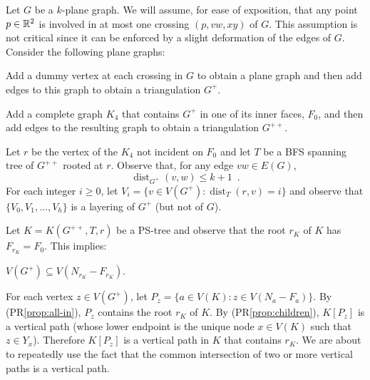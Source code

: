 \documentclass{patmorin}
\DeclareMathOperator{\dist}{dist}
\renewcommand{\proplabel}[1]{\label{prop:#1}}
\renewcommand{\propref}[1]{(PR\ref{prop:#1})}
\begin{document}
Let $G$ be a $k$-plane graph.  We will assume, for ease of exposition, that any point $p\in\mathbb{R}^2$ is involved in at most one crossing $(p,vw,xy)$ of $G$. This assumption is not critical since it can be enforced by a slight deformation of the edges of $G$.   Consider the following plane graphs:
\begin{compactenum}
  \item Add a dummy vertex at each crossing in $G$ to obtain a plane graph and then add edges to this graph to obtain a triangulation $G^+$.
  \item Add a complete graph $K_4$ that contains $G^{+}$ in one of its inner faces, $F_0$, and then add edges to the resulting graph to obtain a triangulation $G^{++}$.
\end{compactenum}
Let $r$ be the vertex of the $K_4$ not incident on $F_0$ and let $T$ be a BFS spanning tree of $G^{++}$ rooted at $r$. Observe that, for any edge $vw\in E(G)$, 
\[  \dist_{G^+}(v,w) \le k+1 \enspace . \]
For each integer $i\ge 0$, let $V_i=\{v\in V(G^+): \dist_{T}(r,v)=i\}$ and observe that $\{V_0,V_1,\ldots,V_{h}\}$ is a layering of $G^+$ (but not of $G$).

Let $K=K(G^{++},T,r)$ be a PS-tree and observe that the root $r_K$ of $K$ has $F_{r_K}=F_0$.  This implies:
\begin{compactenum}[(PR1)]\setcounter{enumi}{4}
  \item \proplabel{all-in}  $V(G^+)\subseteq V(N_{r_K}-F_{r_K})$.
\end{compactenum}

For each vertex $z\in V(G^+)$, let $P_z=\{a\in V(K): z\in V(N_a-F_a)\}$.  
By \propref{all-in}, $P_{z}$ contains the root $r_K$ of $K$.  By \propref{children}, $K[P_z]$ is a vertical path (whose lower endpoint is the unique node $x\in V(K)$ such that $z\in Y_x$). Therefore $K[P_z]$ is a vertical path in $K$ that contains $r_K$.  We are about to repeatedly use the fact that the common intersection of two or more vertical paths is a vertical path. 
\end{document}
